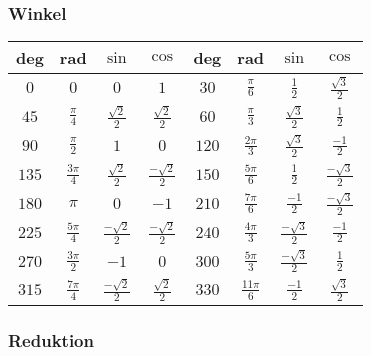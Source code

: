 \subsubsection{Winkel}
\begin{tabular}{c c c c || c c c c}
    deg   & rad                & $\sin$                 & $\cos$                  & deg & rad & $\sin$ & $\cos$\\\hline
    $0$   & $0$                & $0$                    & $1$                     &
    $30$  & $\frac{\pi}{6}$    & $\frac{1}{2}$          & $\frac{\sqrt{3}}{2}$\\
    $45$  & $\frac{\pi}{4}$    & $\frac{\sqrt{2}}{2}$   & $\frac{\sqrt{2}}{2}$    &
    $60$  & $\frac{\pi}{3}$    & $\frac{\sqrt{3}}{2}$   & $\frac{1}{2}$\\
    $90$  & $\frac{\pi}{2}$    & $1$                    & $0$                     &
    $120$ & $\frac{2\pi}{3}$   & $\frac{\sqrt{3}}{2} $  & $\frac{-1}{2}$\\
    $135$ & $\frac{3 \pi}{4}$  & $\frac{\sqrt{2}}{2}$   & $\frac{-\sqrt{2}}{2}$   &
    $150$ & $\frac{5 \pi}{6}$  & $\frac{1}{2}$          & $\frac{-\sqrt{3}}{2}$\\
    $180$ & $\pi$              & $0$                    & $-1$                    &
    $210$ & $\frac{7\pi}{6}$   & $\frac{-1}{2}$         & $\frac{-\sqrt{3}}{2}$\\
    $225$ & $\frac{5\pi}{4}$   & $\frac{-\sqrt{2}}{2}$  & $\frac{-\sqrt{2}}{2}$   &
    $240$ & $\frac{4\pi}{3}$   & $\frac{-\sqrt{3}}{2}$  & $\frac{-1}{2}$\\
    $270$ & $\frac{3 \pi}{2}$  & $-1$                   & $0$                     &
    $300$ & $\frac{5 \pi}{3}$  & $\frac{-\sqrt{3}}{2} $ & $\frac{1}{2}$\\
    $315$ & $\frac{7 \pi}{4}$  & $\frac{-\sqrt{2}}{2} $ & $\frac{\sqrt{2}}{2}$    &
    $330$ & $\frac{11 \pi}{6}$ & $\frac{-1}{2} $        & $\frac{\sqrt{3}}{2}$\\
\end{tabular}

\subsubsection{Reduktion}

